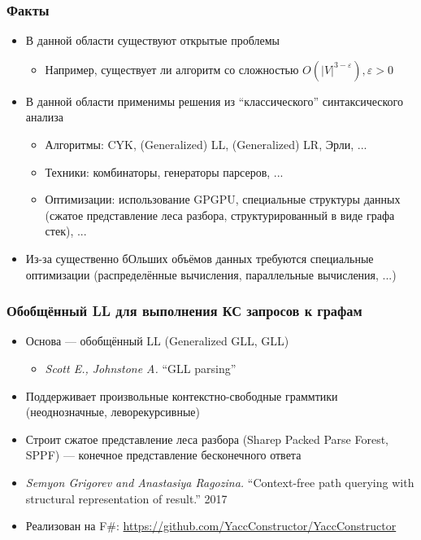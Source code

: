 \documentclass[xcolor=table]{beamer}
\begin{document}
\begin{frame}[fragile]
  \transwipe[direction=90]
  \frametitle{Факты}
  \begin{itemize}
  \item В данной области существуют открытые проблемы
    \begin{itemize}
        \item Например, существует ли алгоритм со сложностью $O(|V|^{3-\varepsilon}), \varepsilon > 0$
    \end{itemize}
  \item В данной области применимы решения из ``классического'' синтаксического анализа
    \begin{itemize}
        \item Алгоритмы: CYK, (Generalized) LL, (Generalized) LR, Эрли, ...
        \item Техники: комбинаторы, генераторы парсеров, ... 
        \item Оптимизации: использование GPGPU, специальные структуры данных (сжатое представление леса разбора, структурированный в виде графа стек), ...
    \end{itemize}
  \item Из-за существенно бОльших объёмов данных требуются специальные оптимизации (распределённые вычисления, параллельные вычисления, ...)
  \end{itemize}

\end{frame}

\begin{frame}[fragile]
  \transwipe[direction=90]
  \frametitle{Обобщённый LL для выполнения КС запросов к графам}

\begin{itemize} 
\item Основа --- обобщённый LL (Generalized GLL, GLL)
\begin{itemize} 
  \item \emph{Scott E., Johnstone A.} ``GLL parsing''
\end{itemize}
\item Поддерживает произвольные контекстно-свободные граммтики (неоднозначные, леворекурсивные)
\item Строит сжатое представление леса разбора (Sharep Packed Parse Forest, SPPF) --- конечное представление бесконечного ответа
\item \emph{Semyon Grigorev and Anastasiya Ragozina.} ``Context-free path querying with structural representation of result.'' 2017
\item Реализован на F\#: \url{https://github.com/YaccConstructor/YaccConstructor}
\end{itemize}
\end{frame}
\end{document}
